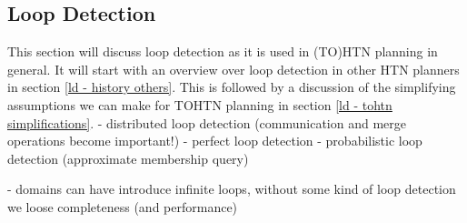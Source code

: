 \subsection{Loop Detection}
\label{improv: loop detection}

This section will discuss loop detection as it is used in (TO)HTN planning in general. It will start with an overview over loop detection in other HTN planners in section \ref{ld - history others}. This is followed by a discussion of the simplifying assumptions we can make for TOHTN planning in section \ref{ld - tohtn simplifications}.
- distributed loop detection (communication and merge operations become important!)
- perfect loop detection
- probabilistic loop detection (approximate membership query)

- \cite{magnaguagno2020hypertension} domains can have introduce infinite loops, without some kind of loop detection we loose completeness (and performance)


